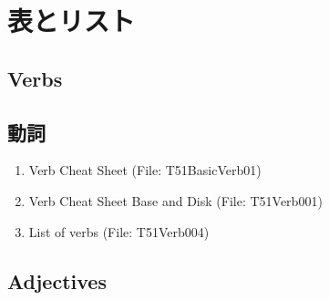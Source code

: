 \documentclass[uplatex,dvipdfmx,b5paper,english,10pt]{jsbook}
\newif\ifCHARTSANDLISTS
\begin{document}






\fi%

\ifCHARTSANDLISTS
\ifEnglish
\chapter{Charts and lists}
\else
\chapter{表とリスト}
\fi

\ifEnglish
\section{Verbs}
\else
\section{動詞}
\fi

\begin{enumerate}
  \item Verb Cheat Sheet (File: T51BasicVerb01)
  \item Verb Cheat Sheet Base and Disk (File: T51Verb001)
  \item List of verbs (File: T51Verb004)
\end{enumerate}

\ifEnglish
\section{Adjectives}
\else
\end{document}
